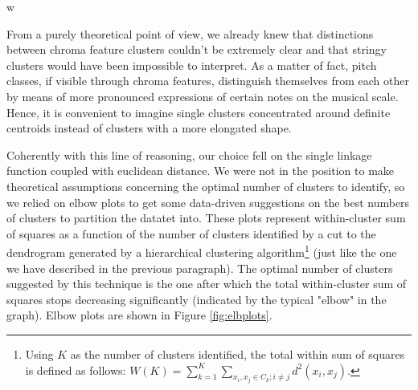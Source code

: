 w\documentclass[11pt, oneside]{article}
\begin{document}
From a purely theoretical point of view, we already knew that distinctions between chroma feature clusters couldn't be extremely clear and that stringy clusters would have been impossible to interpret. As a matter of fact, pitch classes, if visible through chroma features, distinguish themselves from each other by means of  more pronounced expressions of certain notes on the musical scale. Hence, it is convenient to imagine single clusters concentrated around definite centroids instead of clusters with a more elongated shape.

Coherently with this line of reasoning, our choice fell on the single linkage function coupled with euclidean distance. We were not in the position to make theoretical assumptions concerning the optimal number of clusters to identify, so we relied on elbow plots to get some data-driven suggestions on the best numbers of clusters to partition the datatet into. These plots represent within-cluster sum of squares as a function of the number of clusters identified by a cut to the dendrogram generated by a hierarchical clustering algorithm\footnote{Using $K$ as the number of clusters identified, the total within sum of squares is defined as follows: $W\left(K\right)=\sum_{k=1}^K \sum_{x_i, x_j\in C_k; i\neq j} d^2\left(x_i, x_j\right)$.} (just like the one we have described in the previous paragraph). The optimal number of clusters suggested by this technique is the one after which the total within-cluster sum of squares stops decreasing significantly (indicated by the typical "elbow" in the graph). Elbow plots are shown in Figure \ref{fig:elbplots}.
\end{document}
